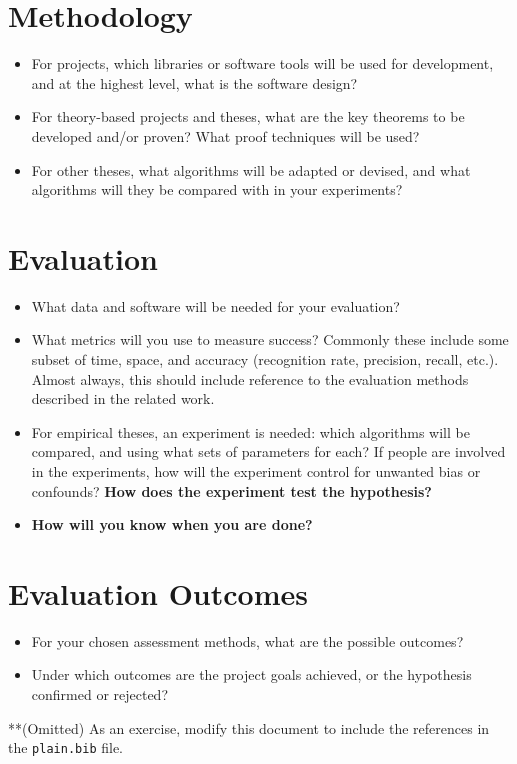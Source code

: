 \documentclass[11pt]{artikel3}
\begin{document}
\section{Methodology}

\begin{itemize}
\item For projects, which libraries or software tools will be used for development, and at the highest level, what is the software design?
\item For theory-based projects and theses, what are the key theorems to be developed and/or proven? What proof techniques will be used?
\item For other theses, what algorithms will be adapted or devised, and what algorithms will they be compared with in your experiments?
\end{itemize}

\section{Evaluation}

\begin{itemize}
\item What data and software will be needed for your evaluation? 
\item What metrics
will you use to measure success? Commonly these include some subset of time, space, and accuracy (recognition rate, precision, recall, etc.).
Almost always, this should include reference to the evaluation methods described in the related work.
\item For empirical theses, an experiment is needed: which algorithms will be compared, and using what sets of parameters for each? If people are involved in the experiments, how will the experiment control for unwanted bias or confounds? {\bf How does the experiment test the hypothesis?}
\item {\bf How will you know when you are done?}
\end{itemize}

\section{Evaluation Outcomes}

\begin{itemize}
\item For your chosen assessment methods, what are the possible outcomes? 
\item Under which outcomes are the project goals achieved, or the hypothesis confirmed or rejected?
\end{itemize}




**(Omitted) As an exercise, modify this document to include the references in the {\tt plain.bib} file.
\end{document}
